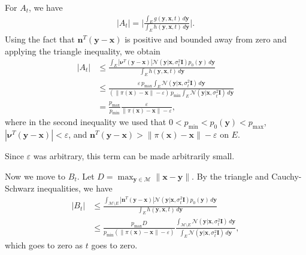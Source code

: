 For $A_t$, we have
\begin{gather*}
    |A_t| = \bigg| \frac{\int_{E} g(\textbf{y}, \textbf{x}, t)\, d\textbf{y}}{\int_{E} h(\textbf{y}, \textbf{x}, t)\, d\textbf{y}} \bigg|. 
\end{gather*}
Using the fact that $\textbf{n}^T (\textbf{y}-\textbf{x})$ is positive and bounded away from zero and applying the triangle inequality, we obtain
\begin{align*}
    |A_t| &\leq \frac{\int_{E} |\boldsymbol{\nu}^T (\textbf{y}-\textbf{x})| \mathcal{N}(\textbf{y} | \textbf{x}, \sigma^2_t \textbf{I}) p_0(\textbf{y})\, d\textbf{y}}{\int_{E} h(\textbf{y}, \textbf{x}, t)\, d\textbf{y}} \\
        &\leq \frac{ \varepsilon\, p_\text{max} \int_{E} \mathcal{N}(\textbf{y} | \textbf{x}, \sigma^2_t \textbf{I})\, d\textbf{y}}{ (\|\pi(\textbf{x}) - \textbf{x}\| - \varepsilon )\, p_\text{min} \int_{E} \mathcal{N}(\textbf{y} | \textbf{x}, \sigma^2_t \textbf{I})\, d\textbf{y}} \\
    &= \frac{p_\text{max}}{p_\text{min}} \frac{ \varepsilon}{\|\pi(\textbf{x}) - \textbf{x}\| - \varepsilon},
\end{align*}
where in the second inequality we used that $0 < p_\text{min} < p_0(\textbf{y}) < p_\text{max}$, $|\boldsymbol{\nu}^T(\textbf{y}-\textbf{x})| < \varepsilon$, and $\textbf{n}^T(\textbf{y}-\textbf{x}) > \|\pi(\textbf{x}) - \textbf{x}\| - \varepsilon$ on $E$.

Since $\varepsilon$ was arbitrary, this term can be made arbitrarily small.

Now we move to $B_t$. Let $D = \max_{\textbf{y} \in \mathcal{M}} \|\textbf{x} - \textbf{y}\|$. By the triangle and Cauchy-Schwarz inequalities, we have
\begin{align*}
    |B_t| &\leq \frac{ \int_{\mathcal{M} \setminus E} |\textbf{n}^T (\textbf{y}-\textbf{x})| \mathcal{N}(\textbf{y} | \textbf{x}, \sigma^2_t \textbf{I}) p_0(\textbf{y})\, d\textbf{y}}{\int_{E} h(\textbf{y}, \textbf{x}, t)\, d\textbf{y}} \\
    &\leq \frac{ p_\text{max} D}{ p_\text{min} (\|\pi(\textbf{x}) - \textbf{x}\| - \varepsilon)} \frac{\int_{\mathcal{M} \setminus E}  \mathcal{N}(\textbf{y} | \textbf{x}, \sigma^2_t \textbf{I})\, d\textbf{y}}{\int_{E} \mathcal{N}(\textbf{y} | \textbf{x}, \sigma^2_t \textbf{I})\, d\textbf{y}},
\end{align*}
which goes to zero as $t$ goes to zero.


